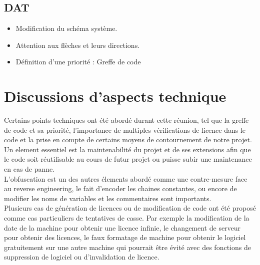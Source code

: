 \documentclass{article}
\begin{document}
\subsection{DAT}
\begin{itemize}
    \item Modification du schéma système.
    \item Attention aux flèches et leurs directions.
    \item Définition d'une priorité : Greffe de code

\end{itemize}
\section{Discussions d'aspects technique}

Certains points techniques ont été abordé durant cette réunion, tel que la greffe de code et sa priorité, l'importance de
multiples vérifications de licence dans le code et la prise en compte de certains moyens de contournement de notre projet.\\

Un element essentiel est la maintenabilité du projet et de ses extensions afin que le code soit réutilisable au cours de 
futur projet ou puisse subir une maintenance en cas de panne.\\

L'obfuscation est un des autres élements abordé comme une contre-mesure face au reverse engineering, le fait d'encoder les chaines constantes,
ou encore de modifier les noms de variables et les commentaires sont importants.\\

Plusieurs cas de génération de licences ou de modification de code ont été proposé comme cas particuliers de tentatives de casse. Par exemple 
la modification de la date de la machine pour obtenir une licence infinie, le changement de serveur pour obtenir des licences, 
le faux formatage de machine pour obtenir le logiciel gratuitement sur une autre machine qui pourrait être évité avec des fonctions 
de suppression de logiciel ou d'invalidation de licence. 

\newpage
\end{document}
